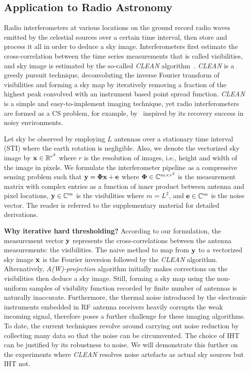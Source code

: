\documentclass{article}
\begin{document}
\subsection{Application to Radio Astronomy}
Radio interferometers at various locations on the ground record radio waves emitted by the celestial sources over a certain time interval, then store and process it all in order to deduce a sky image. Interferometers first estimate the cross-correlation between the time series measurements that is called visibilities, and sky image is estimated by the so-called {\it CLEAN} algorithm~\cite{hogbom1974clean}. {\it CLEAN} is a greedy pursuit technique, deconvoluting the inverse Fourier transform of visibilities and forming a sky map by iteratively removing a fraction of the highest peak convolved with an instrument based point spread function. {\it CLEAN} is a simple and easy-to-implement imaging technique, yet radio interferometers are formed as a CS problem, for example, by~\cite{wiaux2009csforra, wenger2010csforra, li2011deconvolution} inspired by its recovery success in noisy environments.

Let sky be observed by employing $L$ antennas over a stationary time interval (STI) where the earth rotation is negligible. Also, we denote the vectorized sky image by ${\bf x} \in \mathbb{R}^{r^2}$ where $r$ is the resolution of images, i.e., height and width of the image in pixels. We formulate the interferometer pipeline as a compressive sensing problem such that ${\bf y} = {\bf \Phi} {\bf x} + {\bf e}$ where ${\bf \Phi} \in \mathbb{C}^{m\times r^2}$ is the measurement matrix with complex entries as a function of inner product between antenna and pixel locations, ${\bf y} \in \mathbb{C}^{m}$ is the visibilities where $m=L^2$, and ${\bf e} \in \mathbb{C}^m$ is the noise vector. The reader is referred to the supplementary material for detailed derivations. 


{\bf Why iterative hard thresholding?} According to our formulation, the measurement vector ${\bf y}$ represents the cross-correlations between the antenna measurements: the visibilities. The naive method to map from ${\bf y}$ to a vectorized sky image ${\bf x}$ is the Fourier inversion followed by the {\it CLEAN} algorithm. Alternatively, {\it A(W)-projection} algorithm initially makes corrections on the visibilities then deduce a sky image. Still, forming a sky map using the non-uniform samples of visibility function recorded by finite number of antennas is naturally inaccurate. Furthermore, the thermal noise introduced by the electronic instruments embedded in RF antenna receivers heavily corrupts the weak incoming signal, therefore poses a further challenge for these imaging algorithms. To date, the current techniques revolve around carrying out noise reduction by collecting many data so that the noise can be circumvented. The choice of IHT can be justified by its robustness to noise. We will demonstrate this further on the experiments where {\it CLEAN} resolves noise artefacts as actual sky sources but IHT not.
\end{document}
